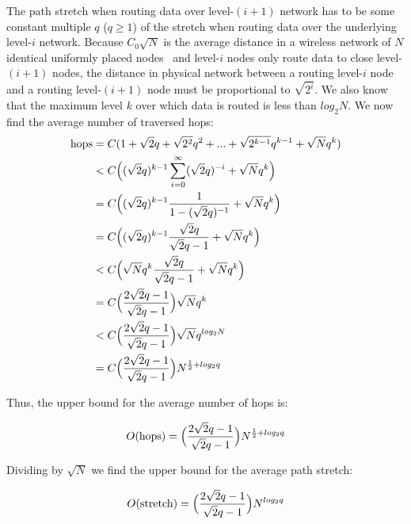 \documentclass[conference]{IEEEtran}
\theoremstyle{definition}
\begin{document}
The path stretch when routing data over level-$(i+1)$ network has to be some constant multiple $q$ ($q \ge 1$) of the stretch when routing data over the underlying level-$i$ network. Because $C_0\sqrt{N}$ is the average distance in a wireless network of $N$ identical uniformly placed nodes~\cite{Kleinrock} and level-$i$ nodes only route data to close level-$(i+1)$ nodes, the distance in physical network between a routing level-$i$ node and a routing level-$(i+1)$ node must be proportional to $\sqrt{2^i}$. We also know that the maximum level $k$ over which data is routed is less than $log_2N$. We now find the average number of traversed hops:
\begin{equation*}
\begin{split}
    {\rm hops} & = C (1 + \sqrt{2} q + \sqrt{2^2} q^2  + ... + \sqrt{2^{k-1}} q^{k-1} + \sqrt{N} q^k) \\
               & < C \Big( (\sqrt{2} q)^{k-1} \sum_{i = 0}^{\infty} (\sqrt{2}q)^{-i} + \sqrt{N} q^k \Big) \\
               & = C \Big( (\sqrt{2} q)^{k-1} \frac{1}{1 - (\sqrt{2}q)^{-1}} + \sqrt{N} q^k \Big)  \\
               & = C \Big( (\sqrt{2} q)^{k-1} \frac{\sqrt{2} q}{\sqrt{2}q - 1} + \sqrt{N} q^k \Big)  \\
               & < C \Big( \sqrt{N} q^k \frac{\sqrt{2} q}{\sqrt{2}q - 1} + \sqrt{N} q^k \Big)  \\
               & = C \Big( \frac{2\sqrt{2}q - 1}{\sqrt{2}q - 1} \Big) \sqrt{N} q^k  \\
               & < C \Big( \frac{2\sqrt{2}q - 1}{\sqrt{2}q - 1} \Big) \sqrt{N} q^{log_2 N}  \\
               & = C \Big( \frac{2\sqrt{2}q - 1}{\sqrt{2}q - 1} \Big) N^{\frac{1}{2} + log_2 q}
\end{split}
\end{equation*}

Thus, the upper bound for the average number of hops is:

\begin{equation*}
    O({\rm hops}) = \Big( \frac{2\sqrt{2}q - 1}{\sqrt{2}q - 1}  \Big) N^{\frac{1}{2} + log_2 q}
\end{equation*}

Dividing by $\sqrt{N}$ we find the upper bound for the average path stretch:

\begin{equation*}
    O({\rm stretch}) = \Big( \frac{2\sqrt{2}q - 1}{\sqrt{2}q - 1} \Big) N^{log_2 q}
\end{equation*}
\end{document}
